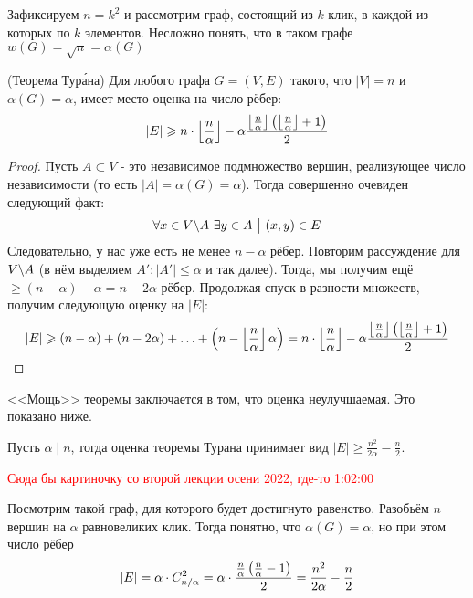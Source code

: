 \begin{example}
	Зафиксируем $n = k^2$ и рассмотрим граф, состоящий из $k$ клик, в каждой из которых по $k$ элементов. Несложно понять, что в таком графе $w(G) = \sqrt{n} = \alpha(G)$
\end{example}

\begin{theorem} (Теорема Тур\'{а}на)
	Для любого графа $G = (V, E)$ такого, что $|V| = n$ и $\alpha(G) = \alpha$, имеет место оценка на число рёбер:
	\[
		|E| \geqslant n \cdot \left\lfloor \frac{n}{\alpha} \right\rfloor - \alpha \frac{\left\lfloor \frac{n}{\alpha} \right\rfloor\left(\left\lfloor \frac{n}{\alpha} \right\rfloor + 1\right)}{2}
	\]
\end{theorem}

\begin{proof}
	Пусть $A \subset V$ - это независимое подмножество вершин, реализующее число независимости (то есть $|A| = \alpha(G) = \alpha$). Тогда совершенно очевиден следующий факт:
	\[
		\forall x \in V \backslash A\ \exists y \in A \ \big|\  (x, y) \in E
	\]
	Следовательно, у нас уже есть не менее $n - \alpha$ рёбер. Повторим рассуждение для $V \backslash A$ (в нём выделяем $A' \colon |A'| \le \alpha$ и так далее). Тогда, мы получим ещё $\ge (n - \alpha) - \alpha = n - 2\alpha$ рёбер. Продолжая спуск в разности множеств, получим следующую оценку на $|E|$:
	\[
		|E| \geqslant (n - \alpha) + (n - 2\alpha) + \ldots + \left(n - \left\lfloor \frac{n}{\alpha} \right\rfloor\alpha\right) = n \cdot \left\lfloor \frac{n}{\alpha} \right\rfloor - \alpha \frac{\left\lfloor \frac{n}{\alpha} \right\rfloor\left(\left\lfloor \frac{n}{\alpha} \right\rfloor + 1\right)}{2}
	\]
\end{proof}

\begin{note}
	<<Мощь>> теоремы заключается в том, что оценка неулучшаемая. Это показано ниже.
\end{note}

\begin{example}
	Пусть $\alpha \mid n$, тогда оценка теоремы Турана принимает вид $|E| \ge \frac{n^2}{2\alpha} - \frac{n}{2}$.
	
	\textcolor{red}{Сюда бы картиночку со второй лекции осени 2022, где-то 1:02:00}
	
	Посмотрим такой граф, для которого будет достигнуто равенство. Разобьём $n$ вершин на $\alpha$ равновеликих клик. Тогда понятно, что $\alpha(G) = \alpha$, но при этом число рёбер
	\[
		|E| = \alpha \cdot C_{n / \alpha}^2 = \alpha \cdot \frac{\frac{n}{\alpha} \left(\frac{n}{\alpha} - 1\right)}{2} = \frac{n^2}{2\alpha} - \frac{n}{2}
	\]
\end{example}

